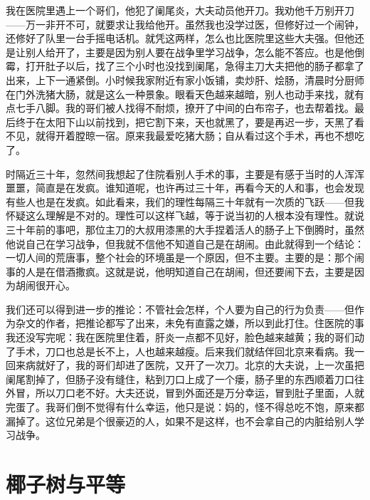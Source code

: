 我在医院里遇上一个哥们，他犯了阑尾炎，大夫动员他开刀。我劝他千万别开刀——万一非开不可，就要求让我给他开。虽然我也没学过医，但修好过一个闹钟，还修好了队里一台手摇电话机。就凭这两样，怎么也比医院里这些大夫强。但他还是让别人给开了，主要是因为别人要在战争里学习战争，怎么能不答应。也是他倒霉，打开肚子以后，找了三个小时也没找到阑尾，急得主刀大夫把他的肠子都拿了出来，上下一通紧倒。小时候我家附近有家小饭铺，卖炒肝、烩肠，清晨时分厨师在门外洗猪大肠，就是这么一种景象。眼看天色越来越暗，别人也动手来找，就有点七手八脚。我的哥们被人找得不耐烦，撩开了中间的白布帘子，也去帮着找。最后终于在太阳下山以前找到，把它割下来，天也就黑了，要是再迟一步，天黑了看不见，就得开着膛晾一宿。原来我最爱吃猪大肠；自从看过这个手术，再也不想吃了。 

时隔近三十年，忽然间我想起了住院看别人手术的事，主要是有感于当时的人浑浑噩噩，简直是在发疯。谁知道呢，也许再过三十年，再看今天的人和事，也会发现有些人也是在发疯。如此看来，我们的理性每隔三十年就有一次质的飞跃——但我怀疑这么理解是不对的。理性可以这样飞越，等于说当初的人根本没有理性。就说三十年前的事吧，那位主刀的大叔用漆黑的大手捏着活人的肠子上下倒腾时，虽然他说自己在学习战争，但我就不信他不知道自己是在胡闹。由此就得到一个结论：一切人间的荒唐事，整个社会的环境虽是一个原因，但不主要。主要的是：那个闹事的人是在借酒撒疯。这就是说，他明知道自己在胡闹，但还要闹下去，主要是因为胡闹很开心。 

我们还可以得到进一步的推论：不管社会怎样，个人要为自己的行为负责——但作为杂文的作者，把推论都写了出来，未免有直露之嫌，所以到此打住。住医院的事我还没写完呢：我在医院里住着，肝炎一点都不见好，脸色越来越黄；我的哥们动了手术，刀口也总是长不上，人也越来越瘦。后来我们就结伴回北京来看病。我一回来病就好了，我的哥们却进了医院，又开了一次刀。北京的大夫说，上一次虽把阑尾割掉了，但肠子没有缝住，粘到刀口上成了一个瘘，肠子里的东西顺着刀口往外冒，所以刀口老不好。大夫还说，冒到外面还是万分幸运，冒到肚子里面，人就完蛋了。我哥们倒不觉得有什么幸运，他只是说：妈的，怪不得总吃不饱，原来都漏掉了。这位兄弟是个很豪迈的人，如果不是这样，也不会拿自己的内脏给别人学习战争。

\chapter{椰子树与平等} 

